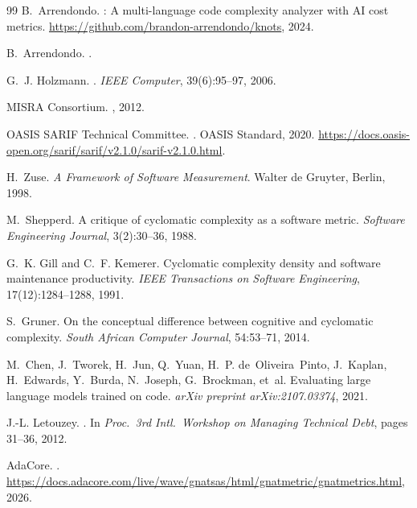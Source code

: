 \documentclass[10pt,twocolumn,letterpaper]{article}
\begin{document}
\begin{thebibliography}{99}
B.~Arrendondo.
: A multi-language code complexity analyzer with AI cost
  metrics.
\newblock \url{https://github.com/brandon-arrendondo/knots}, 2024.

B.~Arrendondo.
.
\newblock %

G.~J. Holzmann.
.
\newblock \emph{IEEE Computer}, 39(6):95--97, 2006.

{MISRA Consortium}.
, 2012.

{OASIS SARIF Technical Committee}.
.
\newblock OASIS Standard, 2020.
\newblock \url{https://docs.oasis-open.org/sarif/sarif/v2.1.0/sarif-v2.1.0.html}.

H.~Zuse.
\newblock \emph{A Framework of Software Measurement}.
\newblock Walter de Gruyter, Berlin, 1998.

M.~Shepperd.
\newblock A critique of cyclomatic complexity as a software metric.
\newblock \emph{Software Engineering Journal}, 3(2):30--36, 1988.

G.~K. Gill and C.~F. Kemerer.
\newblock Cyclomatic complexity density and software maintenance productivity.
\newblock \emph{IEEE Transactions on Software Engineering}, 17(12):1284--1288,
  1991.

S.~Gruner.
\newblock On the conceptual difference between cognitive and cyclomatic
  complexity.
\newblock \emph{South African Computer Journal}, 54:53--71, 2014.

M.~Chen, J.~Tworek, H.~Jun, Q.~Yuan, H.~P. de~Oliveira~Pinto, J.~Kaplan,
  H.~Edwards, Y.~Burda, N.~Joseph, G.~Brockman, et~al.
\newblock Evaluating large language models trained on code.
\newblock \emph{arXiv preprint arXiv:2107.03374}, 2021.

J.-L. Letouzey.
.
\newblock In \emph{Proc.\ 3rd Intl.\ Workshop on Managing Technical Debt},
  pages 31--36, 2012.

{AdaCore}.
.
\newblock \url{https://docs.adacore.com/live/wave/gnatsas/html/gnatmetric/gnatmetrics.html},
  2026.


\end{thebibliography}
\end{document}
